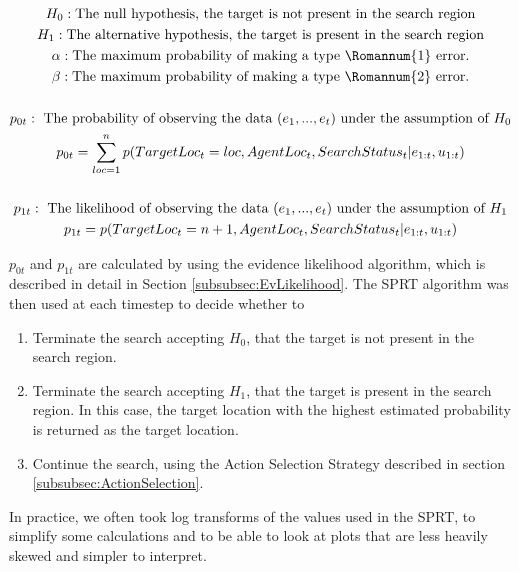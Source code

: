 \begin{gather}\label{eqn:SPRTQuantities}
H_0 : \text{The null hypothesis, the target is not present in the search region}\nonumber
\\ \nonumber
H_1 : \text{The alternative hypothesis, the target is present in the search region}\nonumber
\\ \nonumber
\alpha : \text{The maximum probability of making a type } \Romannum{1} \text{ error.} \nonumber
\\ \nonumber
\beta : \text{The maximum probability of making a type } \Romannum{2} \text{ error.}\nonumber
\\ \nonumber
\\ \nonumber
p_{0t} : \text{ The probability of observing the data $(e_1, ..., e_t)$ under the assumption of $H_0$} \nonumber
\\ \nonumber
p_{0t}=\sum_{loc=1}^{n} p(TargetLoc_t = loc, AgentLoc_t, SearchStatus_t| e_{1:t}, u_{1:t})\nonumber
\\ \nonumber
\\ \nonumber
p_{1t} : \text{ The likelihood of observing the data $(e_1, ..., e_t)$ under the assumption of $H_1$} \nonumber
\\ \nonumber
p_{1t}=p(TargetLoc_t = n+1, AgentLoc_t, SearchStatus_t | e_{1:t}, u_{1:t})\nonumber 
\end{gather}

$p_{0t}$ and $p_{1t}$ are calculated by using the evidence likelihood algorithm, which is described in detail in Section \ref{subsubsec:EvLikelihood}. The SPRT algorithm was then used at each timestep to decide whether to 
\begin{enumerate}
    \item Terminate the search accepting $H_0$, that the target is not present in the search region.
    \item Terminate the search accepting $H_1$, that the target is present in the search region. In this case, the target location with the highest estimated probability is returned as the target location.
    \item Continue the search, using the Action Selection Strategy described in section \ref{subsubsec:ActionSelection}.
\end{enumerate}
In practice, we often took log transforms of the values used in the SPRT, to simplify some calculations and to be able to look at plots that are less heavily skewed and simpler to interpret.

